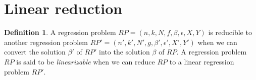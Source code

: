 \documentclass{article}
\theoremstyle{definition}
\newtheorem{definition}{Definition}[section]
\theoremstyle{remark}
\theoremstyle{example}
\begin{document}

\section{Linear reduction}

\begin{definition}
		A regression problem $RP = (n, k, N, f, \beta, \epsilon, X, Y)$ is reducible to another regression problem $RP' = (n', k', N', g, \beta', \epsilon', X', Y')$ when we can convert the solution $\beta'$ of $RP'$ into the solution $\beta$ of $RP$. A regression problem $RP$ is said to be \textit{linearizable} when we can reduce $RP$ to a linear regression problem $RP'$. %
\end{definition}
\end{document}
